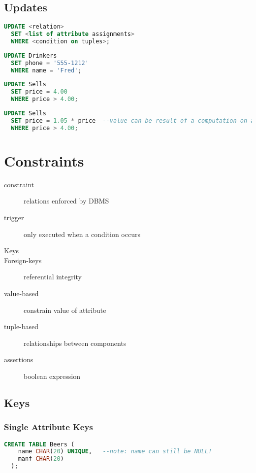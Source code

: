 \documentclass[12pt]{article}
\begin{document}
\subsection{Updates}
\begin{lstlisting}[language=sql,caption=UPDATE template]
  UPDATE <relation>
  SET <list of attribute assignments>
  WHERE <condition on tuples>;
\end{lstlisting}

\begin{lstlisting}[language=sql,caption=Change Fred's Phone number]
  UPDATE Drinkers
  SET phone = '555-1212'
  WHERE name = 'Fred';
\end{lstlisting}

\begin{lstlisting}[language=sql,caption=set maximum price on beers]
  UPDATE Sells
  SET price = 4.00
  WHERE price > 4.00;
\end{lstlisting}

\begin{lstlisting}[language=sql,caption=add tax to price]
  UPDATE Sells
  SET price = 1.05 * price  --value can be result of a computation on attributes
  WHERE price > 4.00;
\end{lstlisting}

\section{Constraints}
\begin{description}
    \item[constraint] relations enforced by DBMS
    \item[trigger] only executed when a condition occurs
\end{description}

\begin{description}
    \item[Keys] 
    \item[Foreign-keys] referential integrity
    \item[value-based] constrain value of attribute
    \item[tuple-based] relationships between components
    \item[assertions] boolean expression
\end{description}

\subsection{Keys}
\subsubsection{Single Attribute Keys}
\begin{lstlisting}[language=sql,caption=ensure names are unique]
  CREATE TABLE Beers (
    name CHAR(20) UNIQUE,   --note: name can still be NULL!
    manf CHAR(20)
  );
\end{lstlisting}
\end{document}
